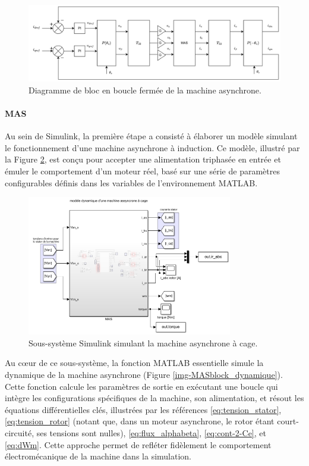 \begin{figure}[!h]
    \centering
    \includegraphics[width=1.0\textwidth]{diagrammes/MAS.png} 
    \caption{Diagramme de bloc en boucle fermée de la machine asynchrone.}
    \label{img-MAS}
\end{figure}

\FloatBarrier
\paragraph{MAS}

Au sein de Simulink, la première étape a consisté à élaborer un modèle simulant le fonctionnement d'une machine asynchrone à induction. Ce modèle, illustré par la Figure \ref{img-MAS_modele}, est conçu pour accepter une alimentation triphasée en entrée et émuler le comportement d'un moteur réel, basé sur une série de paramètres configurables définis dans les variables de l'environnement MATLAB.


\begin{figure}[!h]
    \centering
    \includegraphics[width=0.8\textwidth]{imgsMATLAB/MAS/MAS/MAS_modele.png} 
    \caption{Sous-système Simulink simulant la machine asynchrone à cage.}
    \label{img-MAS_modele}
\end{figure}

Au cœur de ce sous-système, la fonction MATLAB essentielle simule la dynamique de la machine asynchrone (Figure \ref{img-MASblock_dynamique}). Cette fonction calcule les paramètres de sortie en exécutant une boucle qui intègre les configurations spécifiques de la machine, son alimentation, et résout les équations différentielles clés, illustrées par les références \ref{eq:tension_stator}, \ref{eq:tension_rotor} (notant que, dans un moteur asynchrone, le rotor étant court-circuité, ses tensions sont nulles), \ref{eq:flux_alphabeta}, \ref{eq:cont-2-Ce}, et \ref{eq:dWm}. Cette approche permet de refléter fidèlement le comportement électromécanique de la machine dans la simulation.

